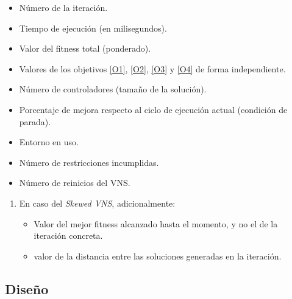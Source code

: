 \begin{enumerate}[label={\textbf{RIO\arabic*}}, ref={Requisito RIO\arabic*},  align=left]
\begin{enumerate}[label*={\textbf{.\arabic*}}]
\begin{itemize}
			\item Número de la iteración.
			\item Tiempo de ejecución (en milisegundos).
			\item Valor del fitness total (ponderado).
			\item Valores de los objetivos \ref{O1}, \ref{O2}, \ref{O3} y \ref{O4} de forma independiente.
			\item Número de controladores (tamaño de la solución).
			\item Porcentaje de mejora respecto al ciclo de ejecución actual (condición de parada).
			\item Entorno en uso.
			\item Número de restricciones incumplidas.
			\item Número de reinicios del VNS.
		\end{itemize}
		\begin{enumerate}[label*={\textbf{.\arabic*}}]
			\item En caso del \textit{Skewed VNS}, adicionalmente:
			\begin{itemize}
				\item Valor del mejor fitness alcanzado hasta el momento, y no el de la iteración concreta.
				\item valor de la distancia entre las soluciones generadas en la iteración.
			\end{itemize}
		\end{enumerate}	
	\end{enumerate}
\end{enumerate}


\subsection{Diseño}
\label{sec:4:diseño}

